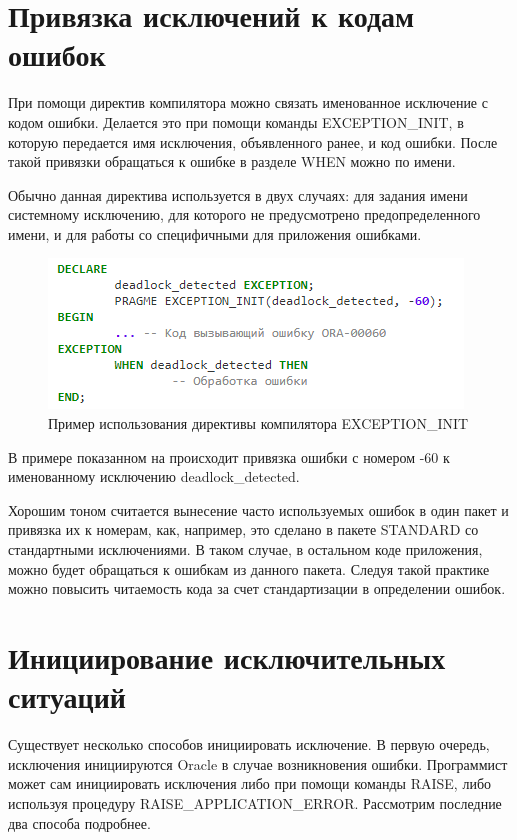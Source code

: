 \section{Привязка исключений к кодам ошибок}\label{ch1:sec2_2}

При помощи директив компилятора можно связать именованное исключение с кодом ошибки. Делается это при помощи команды EXCEPTION\_INIT, в которую передается имя исключения, объявленного ранее, и код ошибки. После такой привязки обращаться к ошибке в разделе WHEN можно по имени. 

Обычно данная директива используется в двух случаях: для задания имени системному исключению, для которого не предусмотрено предопределенного имени, и для работы со специфичными для приложения ошибками.

\begin{figure}[ht!] 
	\center
	\includegraphics [scale=1] {my_folder/img/C1_exception_init}
	\caption{Пример использования директивы компилятора EXCEPTION\_INIT} 
	\label{fig:C1_exeception_init}  
\end{figure}
\FloatBarrier

В примере показанном на  происходит привязка ошибки с номером -60 к именованному исключению deadlock\_detected.

Хорошим тоном считается вынесение часто используемых ошибок в один пакет и привязка их к номерам, как, например, это сделано в пакете STANDARD со стандартными исключениями. В таком случае, в остальном коде приложения, можно будет обращаться к ошибкам из данного пакета. Следуя такой практике можно повысить читаемость кода за счет стандартизации в определении ошибок.

\section{Инициирование исключительных ситуаций}\label{ch1:sec3}

Существует несколько способов инициировать исключение. В первую очередь, исключения инициируются Oracle в случае возникновения ошибки. Программист может сам инициировать исключения либо при помощи команды RAISE, либо используя процедуру RAISE\_APPLICATION\_ERROR. Рассмотрим последние два способа подробнее.
 
